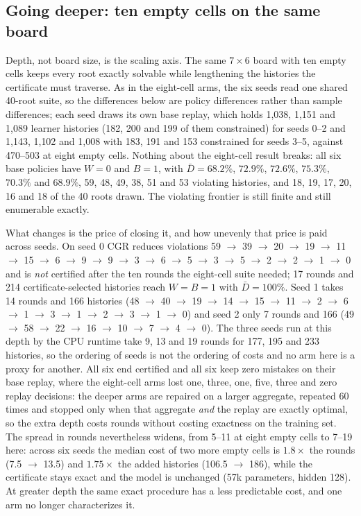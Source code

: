 \documentclass[conference]{IEEEtran}
\begin{document}
\subsection{Going deeper: ten empty cells on the same board}
\label{sec:ten}
Depth, not board size, is the scaling axis. The same $7\times6$ board with ten empty cells keeps every root exactly solvable while lengthening the histories the certificate must traverse. As in the eight-cell arms, the six seeds read one shared 40-root suite, so the differences below are policy differences rather than sample differences; each seed draws its own base replay, which holds 1{,}038, 1{,}151 and 1{,}089 learner histories (182, 200 and 199 of them constrained) for seeds 0--2 and 1{,}143, 1{,}102 and 1{,}008 with 183, 191 and 153 constrained for seeds 3--5, against 470--503 at eight empty cells. Nothing about the eight-cell result breaks: all six base policies have $W=0$ and $B=1$, with $\bar D=68.2\%$, $72.9\%$, $72.6\%$, $75.3\%$, $70.3\%$ and $68.9\%$, 59, 48, 49, 38, 51 and 53 violating histories, and 18, 19, 17, 20, 16 and 18 of the 40 roots drawn. The violating frontier is still finite and still enumerable exactly.

What changes is the price of closing it, and how unevenly that price is paid across seeds. On seed 0 CGR reduces violations 59 $\to$ 39 $\to$ 20 $\to$ 19 $\to$ 11 $\to$ 15 $\to$ 6 $\to$ 9 $\to$ 9 $\to$ 3 $\to$ 6 $\to$ 5 $\to$ 3 $\to$ 5 $\to$ 2 $\to$ 2 $\to$ 1 $\to$ 0 and is \emph{not} certified after the ten rounds the eight-cell suite needed; 17 rounds and 214 certificate-selected histories reach $W=B=1$ with $\bar D=100\%$. Seed 1 takes 14 rounds and 166 histories (48 $\to$ 40 $\to$ 19 $\to$ 14 $\to$ 15 $\to$ 11 $\to$ 2 $\to$ 6 $\to$ 1 $\to$ 3 $\to$ 1 $\to$ 2 $\to$ 3 $\to$ 1 $\to$ 0) and seed 2 only 7 rounds and 166 (49 $\to$ 58 $\to$ 22 $\to$ 16 $\to$ 10 $\to$ 7 $\to$ 4 $\to$ 0). The three seeds run at this depth by the CPU runtime take 9, 13 and 19 rounds for 177, 195 and 233 histories, so the ordering of seeds is not the ordering of costs and no arm here is a proxy for another. All six end certified and all six keep zero mistakes on their base replay, where the eight-cell arms lost one, three, one, five, three and zero replay decisions: the deeper arms are repaired on a larger aggregate, repeated 60 times and stopped only when that aggregate \emph{and} the replay are exactly optimal, so the extra depth costs rounds without costing exactness on the training set. The spread in rounds nevertheless widens, from 5--11 at eight empty cells to 7--19 here: across six seeds the median cost of two more empty cells is $1.8\times$ the rounds (7.5 $\to$ 13.5) and $1.75\times$ the added histories (106.5 $\to$ 186), while the certificate stays exact and the model is unchanged (57k parameters, hidden 128). At greater depth the same exact procedure has a less predictable cost, and one arm no longer characterizes it.
\end{document}
